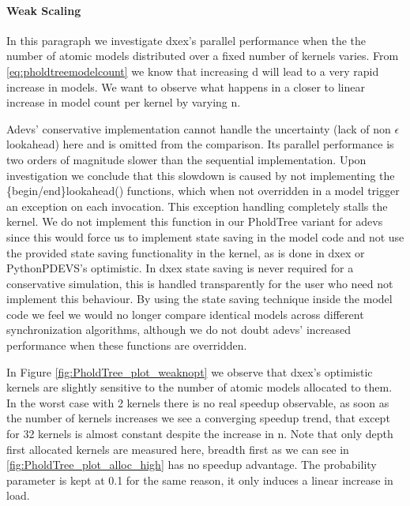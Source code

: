 \paragraph*{Weak Scaling}
In this paragraph we investigate dxex's parallel performance when the the number of atomic models distributed over a fixed number of kernels varies. From \ref{eq:pholdtreemodelcount} we know that increasing d will lead to a very rapid increase in models. We want to observe what happens in a closer to linear increase in model count per kernel by varying n. 

Adevs' conservative implementation cannot handle the uncertainty (lack of non $\epsilon$ lookahead) here and is omitted from the comparison. Its parallel performance is two orders of magnitude slower than the sequential implementation. Upon investigation we conclude that this slowdown is caused by not implementing the \{begin/end\}lookahead() functions, which when not overridden in a model trigger an exception on each invocation. 
This exception handling completely stalls the kernel. We do not implement this function in our PholdTree variant for adevs since this would force us to implement state saving in the model code and not use the provided state saving functionality in the kernel, as is done in dxex or PythonPDEVS's optimistic.
In dxex state saving is never required for a conservative simulation, this is handled transparently for the user who need not implement this behaviour. 
By using the state saving technique inside the model code we feel we would no longer compare identical models across different synchronization algorithms, although we do not doubt adevs' increased performance when these functions are overridden.

In Figure \ref{fig:PholdTree_plot_weaknopt} we observe that dxex's optimistic kernels are slightly sensitive to the number of atomic models allocated to them. In the worst case with 2 kernels there is no real speedup observable, as soon as the number of kernels increases we see a converging speedup trend, that except for 32 kernels is almost constant despite the increase in n. Note that only depth first allocated kernels are measured here, breadth first as we can see in \ref{fig:PholdTree_plot_alloc_high} has no speedup advantage. The probability parameter is kept at 0.1 for the same reason, it only induces a linear increase in load.

